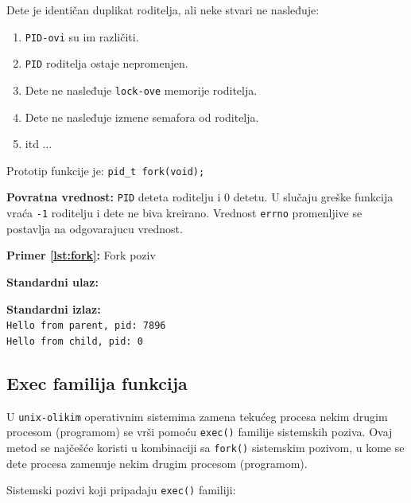 \documentclass[a4paper, 11pt]{article}
\newcommand{\scode}[3] {
	\hspace{.06\textwidth} 
	\begin{minipage}[t]{.88\textwidth} %
		\begin{mdframed}[topline=true,bottomline=true,leftline=true,rightline=true,backgroundcolor=gray!22, linecolor=gray!60!black,roundcorner=1mm]
			 

	\begin{center}
		\caption{\textbf{Primer \ref{lst:#3}:} #2}
	\end{center}
	\end{mdframed}
	\end{minipage}

}
\newcommand{\stdio}[4] {
	\hspace{.06\textwidth} 
	\begin{minipage}[t]{.88\textwidth} %
		\begin{mdframed}[backgroundcolor=black!7,topline=true,bottomline=true,leftline=true,rightline=true,roundcorner=1mm]
		\begin{minipage}[t]{.5\textwidth} %
			\textbf{#1} \\
				\texttt{#3}
		\end{minipage}
		\begin{minipage}[t]{.5\textwidth} %
			\textbf{#2} \\
				\texttt{#4}
		\end{minipage}
		\end{mdframed}
	\end{minipage}
	\vspace{3mm} 
}
\begin{document}
Dete je identičan duplikat roditelja, ali neke stvari ne nasleđuje:
\vspace{-3mm} 
\begin{enumerate}[1)]
	\item{\texttt{PID-ovi} su im različiti.}
	\item{\texttt{PID} roditelja ostaje nepromenjen.}
	\item{Dete ne nasleđuje \texttt{lock-ove} memorije roditelja.}
	 \item{Dete ne nasleđuje izmene semafora od roditelja.}
	 \item[]{itd ...}
\end{enumerate}

Prototip funkcije je: \texttt{pid\_t fork(void);} \\

\vspace{-6mm} 

\textbf{Povratna vrednost:} \texttt{PID} deteta roditelju i 0 detetu. U slučaju greške funkcija vraća \texttt{-1} roditelju i dete ne biva kreirano. Vrednost \texttt{errno} promenljive se postavlja na odgovarajucu vrednost.

\scode{fork.c}{Fork poziv}{fork}
\stdio{Standardni ulaz:}{Standardni izlaz:}{}{Hello from parent, pid: 7896 \\ Hello from child, pid: 0}


\newpage

\subsection{Exec familija funkcija}

U \texttt{unix-olikim} operativnim sistemima zamena tekućeg procesa nekim drugim procesom (programom) se vrši pomoću \texttt{exec()} familije sistemskih poziva. Ovaj metod se najčešće koristi u kombinaciji sa \texttt{fork()} sistemskim pozivom, u kome se dete procesa zamenuje nekim drugim procesom (programom). 

Sistemski pozivi koji pripadaju \texttt{exec()} familiji:
\end{document}

